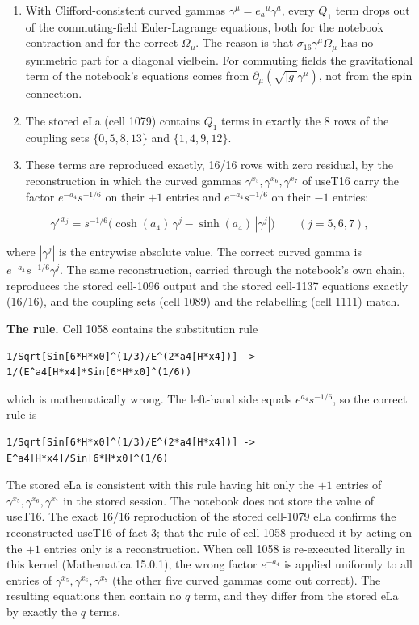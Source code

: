 \documentclass[11pt]{article}
\begin{document}
\begin{enumerate}
\item With Clifford-consistent curved gammas $\gamma^\mu=e_a{}^\mu\gamma^a$, every $Q_1$ term drops out of the commuting-field Euler-Lagrange equations, both for the notebook contraction and for the correct $\Omega_\mu$. The reason is that $\sigma_{16}\gamma^\mu\Omega_\mu$ has no symmetric part for a diagonal vielbein. For commuting fields the gravitational term of the notebook's equations comes from $\partial_\mu(\sqrt{|g|}\gamma^\mu)$, not from the spin connection.
\item The stored eLa (cell 1079) contains $Q_1$ terms in exactly the 8 rows of the coupling sets $\{0,5,8,13\}$ and $\{1,4,9,12\}$.
\item These terms are reproduced exactly, 16/16 rows with zero residual, by the reconstruction in which the curved gammas $\gamma^{x_5},\gamma^{x_6},\gamma^{x_7}$ of useT16 carry the factor $e^{-a_4}s^{-1/6}$ on their $+1$ entries and $e^{+a_4}s^{-1/6}$ on their $-1$ entries:
\end{enumerate}

\[
\gamma'^{\,x_j}=s^{-1/6}\bigl(\cosh(a_4)\,\gamma^j-\sinh(a_4)\,|\gamma^j|\bigr)\qquad(j=5,6,7),
\]

where $|\gamma^j|$ is the entrywise absolute value. The correct curved gamma is $e^{+a_4}s^{-1/6}\gamma^j$. The same reconstruction, carried through the notebook's own chain, reproduces the stored cell-1096 output and the stored cell-1137 equations exactly (16/16), and the coupling sets (cell 1089) and the relabelling (cell 1111) match.

\textbf{The rule.} Cell 1058 contains the substitution rule

\begin{Verbatim}[fontsize=\small]
1/Sqrt[Sin[6*H*x0]^(1/3)/E^(2*a4[H*x4])] -> 1/(E^a4[H*x4]*Sin[6*H*x0]^(1/6))
\end{Verbatim}

which is mathematically wrong. The left-hand side equals $e^{a_4}s^{-1/6}$, so the correct rule is

\begin{Verbatim}[fontsize=\small]
1/Sqrt[Sin[6*H*x0]^(1/3)/E^(2*a4[H*x4])] -> E^a4[H*x4]/Sin[6*H*x0]^(1/6)
\end{Verbatim}

The stored eLa is consistent with this rule having hit only the $+1$ entries of $\gamma^{x_5},\gamma^{x_6},\gamma^{x_7}$ in the stored session. The notebook does not store the value of useT16. The exact 16/16 reproduction of the stored cell-1079 eLa confirms the reconstructed useT16 of fact 3; that the rule of cell 1058 produced it by acting on the $+1$ entries only is a reconstruction. When cell 1058 is re-executed literally in this kernel (Mathematica 15.0.1), the wrong factor $e^{-a_4}$ is applied uniformly to all entries of $\gamma^{x_5},\gamma^{x_6},\gamma^{x_7}$ (the other five curved gammas come out correct). The resulting equations then contain no $q$ term, and they differ from the stored eLa by exactly the $q$ terms.
\end{document}
